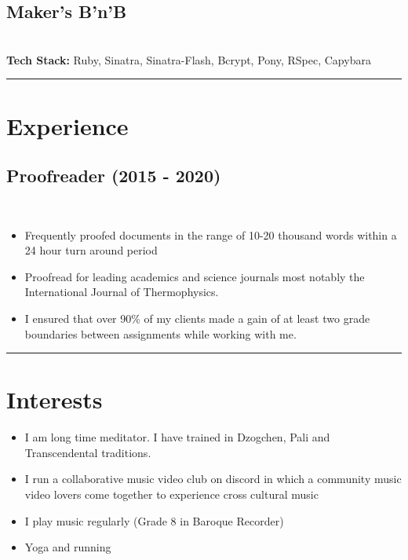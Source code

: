 \documentclass[12pt]{IEEEtran}
\begin{document}
\subsection*{Maker's B'n'B}
 \\
\textbf{Tech Stack:} Ruby, Sinatra, Sinatra-Flash, Bcrypt, Pony, RSpec, Capybara %

\noindent\rule{8cm}{0.4pt}

\section*{Experience}

\subsection*{Proofreader (2015 - 2020)}
\\[1pt]
\begin{itemize}
\item Frequently proofed documents in the range of 10-20 thousand words within a 24 hour turn around period
\item Proofread for leading academics and science journals most notably the International Journal of Thermophysics.
\item I ensured that over 90\% of my clients made a gain of at least two grade boundaries between assignments while working with me.
\end{itemize}

\noindent\rule{8cm}{0.4pt}

\section*{Interests}

\begin{itemize}
\item I am long time meditator. I have trained in Dzogchen, Pali and Transcendental traditions.
\item I run a collaborative music video club on discord in which a community music video lovers come together to experience cross cultural music
\item I play music regularly (Grade 8 in Baroque Recorder)
\item Yoga and running
\end{itemize}
\end{document}
